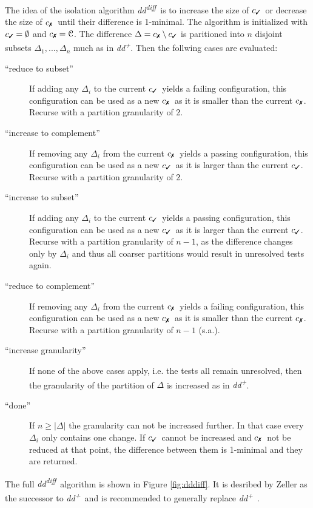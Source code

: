 \documentclass[a4paper,UKenglish]{lipics-v2018}
\newcommand{\ddp}{\textit{dd\textsuperscript{+}}}
\newcommand{\dddiff}{\textit{dd\textsuperscript{diff}}}
\newcommand{\C}[0]{\ensuremath{\mathcal{C}}}
\newcommand{\cmark}{\text{\ding{51}}}
\newcommand{\xmark}{\text{\ding{55}}}
\newcommand{\cpass}{\ensuremath{c_{\cmark}}}
\newcommand{\cfail}{\ensuremath{c_{\xmark}}}
\begin{document}
The idea of the isolation algorithm \dddiff\ is to increase the size of \cpass\ or decrease the size of \cfail\ until their difference is 1-minimal. The algorithm is initialized with $\cpass = \emptyset$ and $\cfail = \C$. The difference $\Delta = \cfail \setminus \cpass$ is paritioned into $n$ disjoint subsets $\Delta_1, ..., \Delta_n$ much as in \ddp. Then the follwing cases are evaluated:

\begin{description}
  	\item[``reduce to subset''] If adding any $\Delta_i$ to the current \cpass\ yields a failing configuration, this configuration can be used as a new \cfail\ as it is smaller than the current \cfail. Recurse with a partition granularity of 2.
  	\item[``increase to complement''] If removing any $\Delta_i$ from the current \cfail\ yields a passing configuration, this configuration can be used as a new \cpass\ as it is larger than the current \cpass. Recurse with a partition granularity of 2.
  	\item[``increase to subset''] If adding any $\Delta_i$ to the current \cpass\ yields a passing configuration, this configuration can be used as a new \cpass\ as it is larger than the current \cpass. Recurse with a partition granularity of $n-1$, as the difference changes only by $\Delta_i$ and thus all coarser partitions would result in unresolved tests again.
  	\item[``reduce to complement''] If removing any $\Delta_i$ from the current \cfail\ yields a failing configuration, this configuration can be used as a new \cfail\, as it is smaller than the current \cfail. Recurse with a partition granularity of $n-1$ (s.a.).
  	\item[``increase granularity''] If none of the above cases apply, i.e. the tests all remain unresolved, then the granularity of the partition of $\Delta$ is increased as in \ddp. 
  	\item[``done''] If $n \ge |\Delta|$ the granularity can not be increased further. In that case every $\Delta_i$ only contains one change. If \cpass\ cannot be increased and \cfail\ not be reduced at that point, the difference between them is 1-minimal and they are returned.\\
\end{description}
The full \dddiff\ algorithm is shown in Figure \ref{fig:dddiff}. It is desribed by Zeller as the successor to \ddp\ and is recommended to generally replace \ddp\ \cite{Zeller:2002:SIF:506201.506206}. \\
\end{document}
